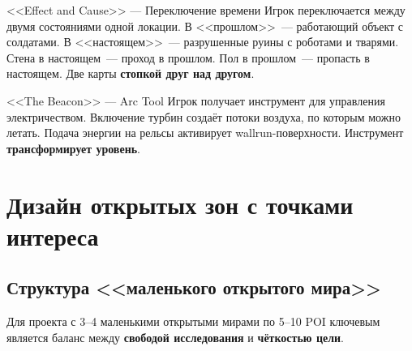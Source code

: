 \documentclass[a4paper,11pt]{report}
\begin{document}
\begin{example}{<<Effect and Cause>> --- Переключение времени}
Игрок переключается между двумя состояниями одной локации.
В <<прошлом>>~--- работающий объект с солдатами.
В <<настоящем>>~--- разрушенные руины с роботами и тварями.
Стена в настоящем~--- проход в прошлом. Пол в прошлом~---
пропасть в настоящем. Две карты \textbf{стопкой друг над другом}.
\end{example}

\begin{example}{<<The Beacon>> --- Arc Tool}
Игрок получает инструмент для управления электричеством.
Включение турбин создаёт потоки воздуха, по которым можно
летать. Подача энергии на рельсы активирует wallrun-поверхности.
Инструмент \textbf{трансформирует уровень}.
\end{example}


\chapter{Дизайн открытых зон с точками интереса}

\section{Структура <<маленького открытого мира>>}

Для проекта с 3--4 маленькими открытыми мирами по 5--10 POI
ключевым является баланс между \textbf{свободой исследования}
и \textbf{чёткостью цели}.
\end{document}
